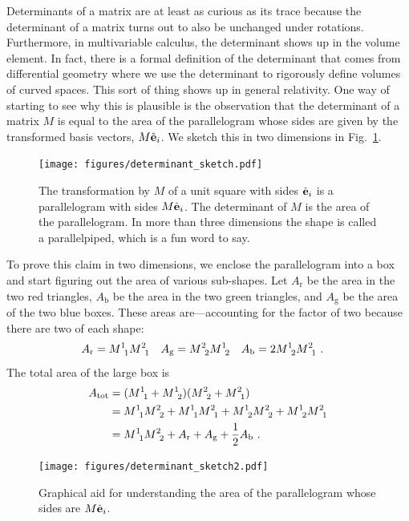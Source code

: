\documentclass[12pt]{article}
\begin{document}
Determinants of a matrix are at least as curious as its trace because the determinant of a matrix turns out to also be unchanged under rotations. Furthermore, in multivariable calculus, the determinant shows up in the volume element. In fact, there is a formal definition of the determinant that comes from differential geometry where we use the determinant to rigorously define volumes of curved spaces. This sort of thing shows up in general relativity.
%
One way of starting to see why this is plausible is the observation that the determinant of a matrix $M$ is equal to the area of the parallelogram whose sides are given by the transformed basis vectors, $M\hat{\mathbf{e}}_i$. We sketch this in two dimensions in Fig.~\ref{fig:determinant:map:area}. 
% 
\begin{figure}[tb]
    \centering
    \texttt{[image: figures/determinant\_sketch.pdf]}
    \caption{The transformation by $M$ of a unit square with sides $\hat{\mathbf{e}}_i$ is a parallelogram with sides $M\hat{\mathbf{e}}_i$. The determinant of $M$ is the area of the parallelogram. In more than three dimensions the shape is called a parallelpiped, which is a fun word to say.}
    \label{fig:determinant:map:area}
\end{figure}
% 
To prove this claim in two dimensions, we enclose the parallelogram into a box and start figuring out the area of various sub-shapes. Let $A_\text{r}$ be the area in the two red triangles, $A_\text{b}$ be the area in the two green triangles, and $A_\text{g}$ be the area of the two blue boxes. These areas are---accounting for the factor of two because there are two of each shape:
\begin{align}
    A_\text{r} &= M\aij 11 M \aij 21
    &
    A_\text{g} &= M\aij 22 M \aij 12
    &
    A_\text{b} &= 2 M\aij 12 M \aij 21 \ .
\end{align}
The total area of the large box is
\begin{align}
    A_\text{tot} &= (M\aij 11 + M\aij 12)(M\aij 22 + M\aij 21) 
    \\&= M\aij 11 M\aij 22 + 
    M\aij 11 M\aij 21 + 
    M\aij 12 M\aij 22 + 
    M\aij 12 M\aij 21 
    \\ &= 
    M\aij 11 M\aij 22 + 
    A_\text{r} + 
    A_\text{g}  + 
    \frac 12 A_\text{b} 
    \ . 
\end{align}
% 
\begin{figure}[tb]
    \centering
    \texttt{[image: figures/determinant\_sketch2.pdf]}
    \caption{Graphical aid for understanding the area of the parallelogram whose sides are $M\hat{\mathbf{e}}_i$.}
    \label{fig:determinant:map:area:proof}
\end{figure}
\end{document}
